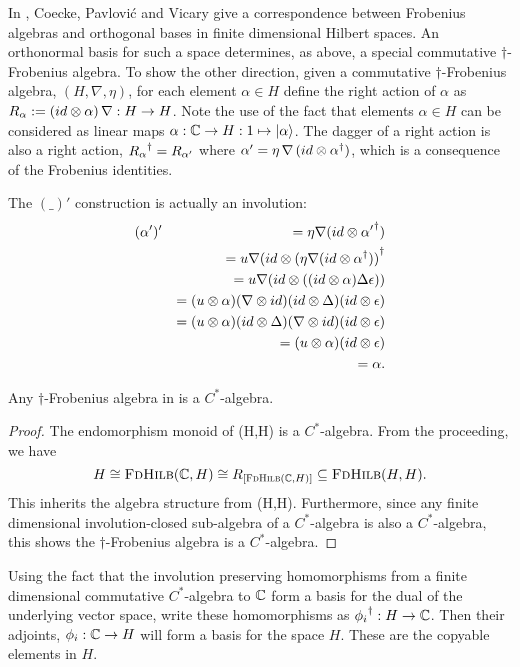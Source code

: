In \cite{coeckeetal08:ortho}, Coecke, Pavlovi\'c and Vicary give a correspondence between Frobenius
algebras and orthogonal bases in finite dimensional Hilbert spaces. An orthonormal basis for such a
space determines, as above, a special commutative $\dagger$-Frobenius algebra. To show the other
direction, given a commutative $\dagger$-Frobenius algebra, $(H,\nabla,\eta)$, for each element
$\alpha\in H$ define the right action of $\alpha$ as $R_{\alpha}:=(id\otimes\alpha)\, \nabla:H\to
H$. Note the use of the fact that elements $\alpha\in H$ can be considered as linear maps
$\alpha:\mathbb{C} \to H:1\mapsto \left\vert{\alpha}\right\rangle$. The dagger of a right action is also a right action,
${R_{\alpha}}^{\dagger} = R_{\alpha'}$ where $\alpha'= \eta\, \nabla\, (id\otimes {\alpha}^{\dagger})$, which is a
consequence of the Frobenius identities.

The $(\_)'$ construction is actually an involution:
\begin{eqnarray*}
  &(\alpha')' &= \eta \nabla (id \otimes {\alpha'}^{\dagger}) \\
  && = u \nabla (id \otimes {(\eta \nabla (id \otimes \ensuremath{{\alpha}^{\dagger}}))}^{\dagger}\\
  && = u \nabla (id \otimes ( (id \otimes \alpha) \Delta \epsilon))\\
  && = (u \otimes \alpha) (\nabla \otimes id) (id \otimes \Delta) (id \otimes  \epsilon)\\
  && = (u \otimes \alpha) (id \otimes \Delta) (\nabla \otimes id) (id \otimes  \epsilon)\\
  && = (u \otimes \alpha)  (id \otimes  \epsilon)\\
  && = \alpha.
\end{eqnarray*}

\begin{lemma}\label{lemma:cstaralgebra}
  Any $\dagger$-Frobenius algebra in \fdh is a $C^{*}$-algebra.
\end{lemma}
\begin{proof}
  The endomorphism monoid of \fdh(H,H) is a $C^{*}$-algebra. From the proceeding, we have
  \[
    H \cong \textsc{FdHilb}(\mathbb{C},H) \cong R_{[\textsc{FdHilb}(\mathbb{C},H)]}\subseteq\textsc{FdHilb}(H,H).
  \]
  This inherits the algebra structure from \fdh(H,H). Furthermore, since any finite dimensional
  involution-closed sub-algebra of a $C^{*}$-algebra is also a $C^{*}$-algebra, this shows the
  $\dagger$-Frobenius algebra is a $C^{*}$-algebra.
\end{proof}

Using the fact that the involution preserving homomorphisms from a finite dimensional commutative
$C^{*}$-algebra to $\mathbb{C}$ form a basis for the dual of the underlying vector space, write these
homomorphisms as ${\phi_{i}}^{\dagger}:H \to \mathbb{C}$. Then their adjoints, $\phi_{i}:\mathbb{C}\to H$ will form a
basis for the space $H$. These are the copyable elements in $H$.


